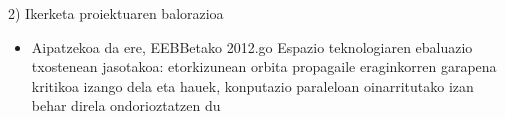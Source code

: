 \documentclass[
 10pt,%
 compress,%
 t,       %
 xcolor=svgnames
]{beamer}
\theoremstyle{definition} \newtheorem{definicion}{Definicion}[section]
\theoremstyle{propiedades} \newtheorem{propiedades}{Propiedades}[section]
\begin{document}
\begin{frame}{2) Ikerketa proiektuaren balorazioa}
{\begin{itemize}
\begin{itemize}
   \end{itemize}
	
	\medskip
	\item Aipatzekoa da ere, EEBBetako 2012.go Espazio teknologiaren ebaluazio  txostenean jasotakoa:  etorkizunean orbita propagaile eraginkorren garapena kritikoa izango dela eta hauek, konputazio paraleloan oinarritutako izan behar direla ondorioztatzen du


\end{itemize}



}


\end{frame}






\end{document}
